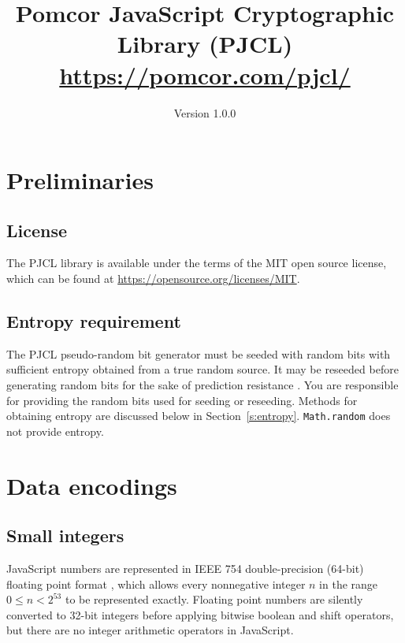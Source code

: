 \documentclass[12pt]{article}
\begin{document}
\title{Pomcor JavaScript Cryptographic Library (PJCL)\\\normalsize\url{https://pomcor.com/pjcl/}}
\author{Version 1.0.0}
\date{}
\maketitle



\tableofcontents
\listoftables

\section{Preliminaries}

\subsection{License}

The PJCL library is available under the terms of the MIT open source license,
which can be found at \url{https://opensource.org/licenses/MIT}.

\subsection{Entropy requirement}

The PJCL pseudo-random bit generator must be seeded with random bits
with sufficient entropy obtained from a true random source.  It may be
reseeded before generating random bits for the sake of prediction
resistance \cite[\S~8.8]{SP800-90Ar1}.  You are responsible for
providing the random bits used for seeding or reseeding.  Methods for
obtaining entropy are discussed below in Section~\ref{s:entropy}.
{\tt Math.random} does not provide entropy.

\section{Data encodings}
\label{s:encodings}

\subsection{Small integers}

JavaScript numbers are represented in IEEE 754
double-precision (64-bit) floating point format
\cite{IEEE-double-precision}, which allows every nonnegative integer
$n$ in the range $0 \leq n < 2^{53}$ to be represented exactly.  
Floating point numbers are silently converted to 32-bit integers 
before applying bitwise boolean and shift operators, but there
are no integer arithmetic operators in JavaScript.
\end{document}
